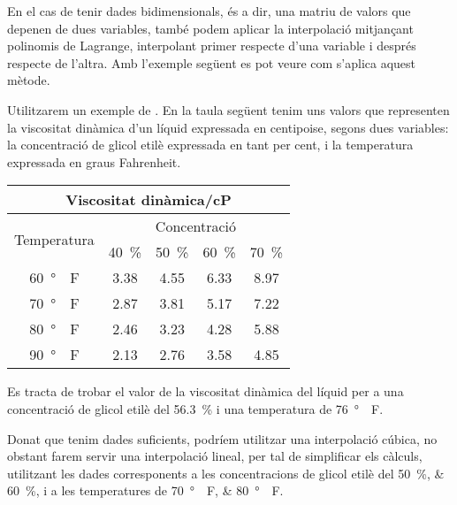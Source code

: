En el cas de tenir dades bidimensionals, és a dir, una matriu de valors que depenen de dues variables, també podem aplicar la interpolació  mitjançant polinomis de Lagrange, interpolant primer respecte d'una variable i després respecte de l'altra. Amb l'exemple següent es pot veure com s'aplica aquest mètode.


\begin{exemple}
    Utilitzarem un exemple de \cite{EJB}. En la taula següent tenim uns valors que representen la viscositat dinàmica d'un líquid expressada en centipoise, segons dues variables: la concentració de glicol etilè
    expressada en tant per cent, i la temperatura expressada en graus Fahrenheit.

    \begin{center}
       \begin{tabular}{ccccc}
       \multicolumn{5}{c}{Viscositat dinàmica/cP}\\
       \toprule[1pt]
       \multirow{2}{25mm}{\rule{0mm}{4.5mm}Temperatura} & \multicolumn{4}{c}{Concentració}\\
       \cmidrule(rl){2-5}
                            & \SI{40}{\percent} & \SI{50}{\percent} & \SI{60}{\percent} & \SI{70}{\percent} \\
       \cmidrule(lr){1-5}
       \SI{60}{\degree{}F}  & \num{3,38}  & \num{4,55}  & \num{6,33}  & \num{8,97} \\
       \SI{70}{\degree{}F}  & \num{2,87}  & \num{3,81}  & \num{5,17}  & \num{7,22} \\
       \SI{80}{\degree{}F}  & \num{2,46}  & \num{3,23}  & \num{4,28}  & \num{5,88} \\
       \SI{90}{\degree{}F}  & \num{2,13}  & \num{2,76}  & \num{3,58}  & \num{4,85} \\
       \bottomrule[1pt]
       \end{tabular}
    \end{center}

    Es tracta de trobar el valor de la viscositat dinàmica del líquid per a una concentració de glicol etilè
    del \SI{56,3}{\percent} i una temperatura de \SI{76}{\degree{}F}.

    Donat que tenim dades suficients, podríem utilitzar una interpolació cúbica, no obstant farem servir una interpolació lineal, per tal de simplificar els càlculs, utilitzant les dades corresponents  a les concentracions de glicol etilè del  \SIlist{50;60}{\percent}, i a les temperatures de  \SIlist{70;80}{\degree{}F}.


\end{exemple}
